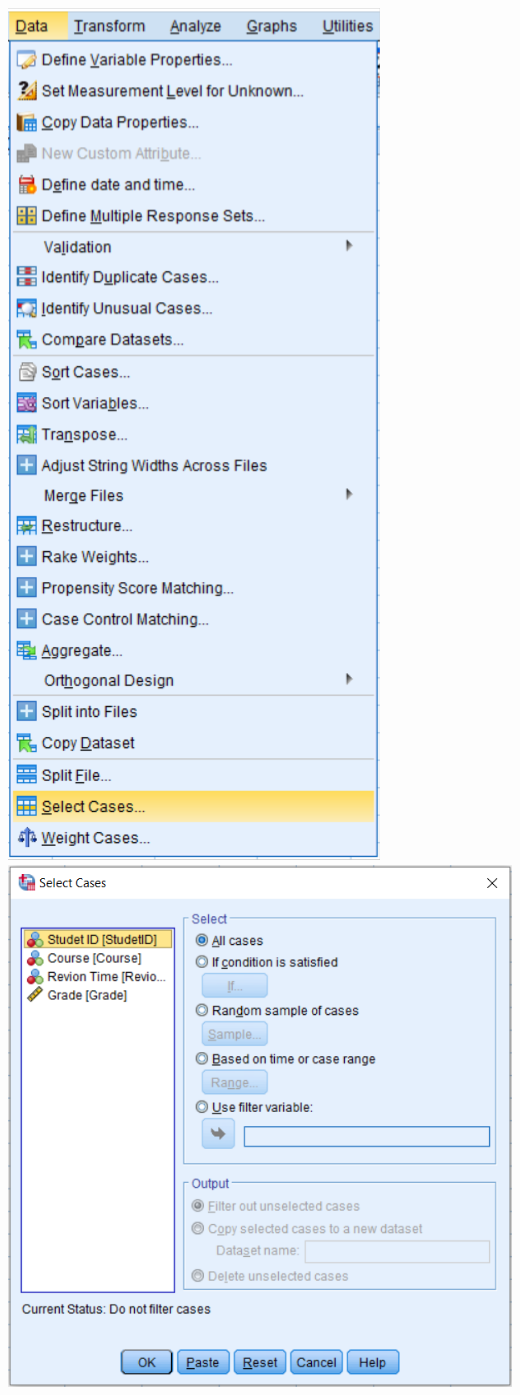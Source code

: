\documentclass[
]{book}
\begin{document}
\includegraphics{SelectCases1.png}
\includegraphics{SelectCases2.png}
\end{document}
